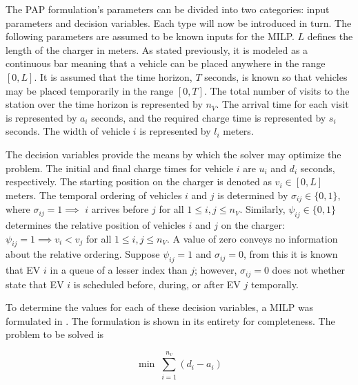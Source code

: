 \documentclass[ee,thesis]{usuthesis}
\begin{document}
The PAP formulation's parameters can be divided into two categories: input parameters and decision variables. Each type
will now be introduced in turn. The following parameters are assumed to be known inputs for the MILP. \(L\) defines the
length of the charger in meters. As stated previously, it is modeled as a continuous bar meaning that a vehicle can be
placed anywhere in the range \([0,L]\). It is assumed that the time horizon, \(T\) seconds, is known so that vehicles may be
placed temporarily in the range \([0,T]\). The total number of visits to the station over the time horizon is represented
by \(n_V\). The arrival time for each visit is represented by \(a_i\) seconds, and the required charge time is represented
by \(s_i\) seconds. The width of vehicle \(i\) is represented by \(l_i\) meters.

The decision variables provide the means by which the solver may optimize the problem. The initial and final charge
times for vehicle \(i\) are \(u_i\) and \(d_i\) seconds, respectively. The starting position on the charger is denoted as \(v_i
\in [0,L]\) meters. The temporal ordering of vehicles \(i\) and \(j\) is determined by \(\sigma_{ij} \in \{0, 1\}\), where \(\sigma_{ij} = 1
\implies\) \(i\) arrives before \(j\) for all \(1 \le i,j \le n_V\). Similarly, \(\psi_{ij} \in \{0, 1\}\) determines the relative
position of vehicles \(i\) and \(j\) on the charger: \(\psi_{ij} = 1 \implies v_i < v_j\) for all \(1 \le i,j \le n_V\). A value of
zero conveys no information about the relative ordering. Suppose \(\psi_{ij} = 1\) and \(\sigma_{ij} = 0\), from this it is known
that EV \(i\) in a queue of a lesser index than \(j\); however, \(\sigma_{ij} = 0\) does not whether state that EV \(i\) is scheduled
before, during, or after EV \(j\) temporally.

To determine the values for each of these decision variables, a MILP was formulated in
\cite{qarebagh-2019-optim-sched}. The formulation is shown in its entirety for completeness. The problem to be solved
is

\begin{equation}
	\label{eq:bapobjective}
	\min\; \sum_{i=1}^{n_v} (d_i - a_i)
\end{equation}
\end{document}
